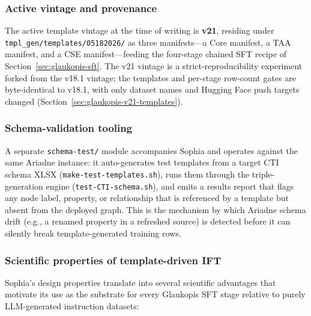 \documentclass[unnumsec,webpdf,contemporary,large]{oup-authoring-template}
\theoremstyle{thmstyleone}
\theoremstyle{thmstyletwo}
\theoremstyle{thmstylethree}
\begin{document}
\subsubsection*{Active vintage and provenance}
The active template vintage at the time of writing is \textbf{v21}, residing under \texttt{tmpl\_gen/templates/05182026/} as three manifests---a Core manifest, a TAA manifest, and a CSE manifest---feeding the four-stage chained SFT recipe of Section~\ref{sec:glaukopis-sft}. The v21 vintage is a strict-reproducibility experiment forked from the v18.1 vintage; the templates and per-stage row-count gates are byte-identical to v18.1, with only dataset names and Hugging Face push targets changed (Section~\ref{sec:glaukopis-v21-templates}).

\subsubsection*{Schema-validation tooling}
A separate \texttt{schema-test/} module accompanies Sophia and operates against the same Ariadne instance: it auto-generates test templates from a target CTI schema XLSX (\texttt{make-test-templates.sh}), runs them through the triple-generation engine (\texttt{test-CTI-schema.sh}), and emits a results report that flags any node label, property, or relationship that is referenced by a template but absent from the deployed graph. This is the mechanism by which Ariadne schema drift (e.g., a renamed property in a refreshed source) is detected before it can silently break template-generated training rows.

\subsubsection*{Scientific properties of template-driven IFT}
Sophia's design properties translate into several scientific advantages that motivate its use as the substrate for every Glaukopis SFT stage relative to purely LLM-generated instruction datasets:
\end{document}
